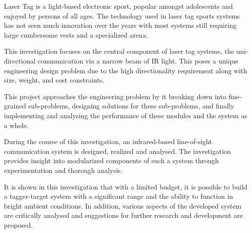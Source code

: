Laser Tag is a light-based electronic sport, popular amongst adolescents and enjoyed by persons of all ages. The technology used in laser tag sports systems has not seen much innovation over the years with most systems still requiring large cumbersome vests and a specialized arena.

This investigation focuses on the central component of laser tag systems, the uni-directional communication via a narrow beam of IR light. This poses a unique engineering design problem due to the high directionality requirement along with size, weight, and cost constraints.

This project approaches the engineering problem by it breaking down into fine-grained sub-problems, designing solutions for these sub-problems, and finally implementing and analysing the performance of these modules and the system as a whole.

During the course of this investigation, an infrared-based line-of-sight communication system is designed, realized and analysed. The investigation provides insight into modularized components of such a system through experimentation and thorough analysis.

It is shown in this investigation that with a limited budget, it is possible to build a tagger-target system with a significant range and the ability to function in bright ambient conditions. In addition, various aspects of the developed system are critically analysed and suggestions for further research and development are proposed.


\iffalse
Your abstract provides a good idea of where the project is going, however, it's missing your key findings and conclusion. An abstract is a highly condensed summary of the entire project and usually follows the following format: intro and problem, project aim, methods, key findings and conclusion.

The abstract is usually the most difficult part to write because of how condensed it needs to be. If you need inspiration, have a look at the abstracts of relevant journal articles :)
\fi